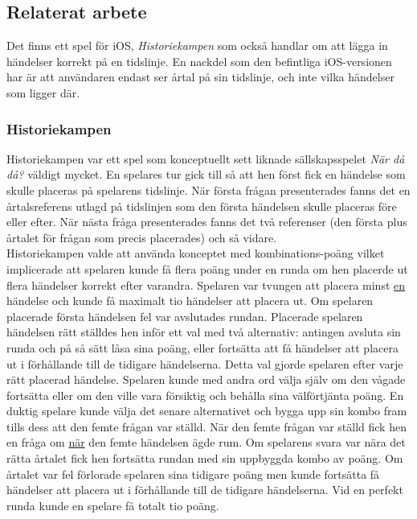 \documentclass[a4paper, 11pt]{article}
\begin{document}
\subsection{Relaterat arbete}
Det finns ett spel för iOS, \textit{Historiekampen} \cite{historiekampen} som också handlar om att lägga in händelser korrekt på en tidslinje. En nackdel som den befintliga iOS-versionen har är att användaren endast ser årtal på sin tidslinje, och inte vilka händelser som ligger där.

\subsubsection{Historiekampen}
Historiekampen var ett spel som konceptuellt sett liknade sällskapsspelet \textit{När då då?} väldigt mycket. En spelares tur gick till så att hen först fick en händelse som skulle placeras på spelarens tidslinje. När första frågan presenterades fanns det en årtalsreferens utlagd på tidslinjen som den första händelsen skulle placeras före eller efter. När nästa fråga presenterades fanns det två referenser (den första plus årtalet för frågan som precis placerades) och så vidare.\\ 
Historiekampen valde att använda konceptet med kombinations-poäng vilket implicerade att spelaren kunde få flera poäng under en runda om hen placerde ut flera händelser korrekt efter varandra. Spelaren var tvungen att placera minst \underline{en} händelse och kunde få maximalt tio händelser att placera ut. Om spelaren placerade första händelsen fel var avslutades rundan. Placerade spelaren händelsen rätt ställdes hen inför ett val med två alternativ: antingen avsluta sin runda och på så sätt låsa sina poäng, eller fortsätta att få händelser att placera ut i förhållande till de tidigare händelserna. Detta val gjorde spelaren efter varje rätt placerad händelse. Spelaren kunde med andra ord välja själv om den vågade fortsätta eller om den ville vara försiktig och behålla sina välförtjänta poäng. En duktig spelare kunde välja det senare alternativet och bygga upp sin kombo fram tills dess att den femte frågan var ställd. När den femte frågan var ställd fick hen en fråga om \underline{när} den femte händelsen ägde rum. Om spelarens svara var nära det rätta årtalet fick hen fortsätta rundan med sin uppbyggda kombo av poäng. Om årtalet var fel förlorade spelaren sina tidigare poäng men kunde fortsätta få händelser att placera ut i förhållande till de tidigare händelserna. Vid en perfekt runda kunde en spelare få totalt tio poäng.
\end{document}
